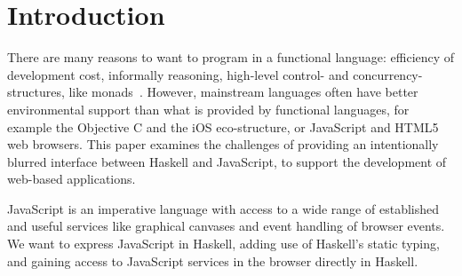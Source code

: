  
\section{Introduction}

There are many reasons to want to program in a functional language:
efficiency of development cost, informally reasoning, high-level 
control- and concurrency-structures, like monads~\cite{...}.
However, mainstream languages often have better environmental support
than what is provided by functional languages,
for example the Objective C and the iOS eco-structure, or JavaScript and HTML5
web browsers.
This paper examines the challenges of providing
an intentionally blurred interface between Haskell
and JavaScript, to support the development of web-based applications.

JavaScript is an imperative language with access to a wide range
of established and useful services like graphical canvases and event
handling of browser events. 
We want to express JavaScript in Haskell, adding use
of Haskell's static typing, and gaining access to JavaScript services
in the browser directly in Haskell.

